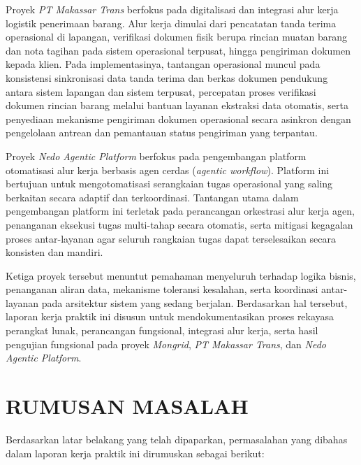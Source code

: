 Proyek \textit{PT Makassar Trans} berfokus pada digitalisasi dan integrasi alur kerja logistik penerimaan barang. Alur kerja dimulai dari pencatatan tanda terima operasional di lapangan, verifikasi dokumen fisik berupa rincian muatan barang dan nota tagihan pada sistem operasional terpusat, hingga pengiriman dokumen kepada klien. Pada implementasinya, tantangan operasional muncul pada konsistensi sinkronisasi data tanda terima dan berkas dokumen pendukung antara sistem lapangan dan sistem terpusat, percepatan proses verifikasi dokumen rincian barang melalui bantuan layanan ekstraksi data otomatis, serta penyediaan mekanisme pengiriman dokumen operasional secara asinkron dengan pengelolaan antrean dan pemantauan status pengiriman yang terpantau.

Proyek \textit{Nedo Agentic Platform} berfokus pada pengembangan platform otomatisasi alur kerja berbasis agen cerdas (\textit{agentic workflow}). Platform ini bertujuan untuk mengotomatisasi serangkaian tugas operasional yang saling berkaitan secara adaptif dan terkoordinasi. Tantangan utama dalam pengembangan platform ini terletak pada perancangan orkestrasi alur kerja agen, penanganan eksekusi tugas multi-tahap secara otomatis, serta mitigasi kegagalan proses antar-layanan agar seluruh rangkaian tugas dapat terselesaikan secara konsisten dan mandiri.

Ketiga proyek tersebut menuntut pemahaman menyeluruh terhadap logika bisnis, penanganan aliran data, mekanisme toleransi kesalahan, serta koordinasi antar-layanan pada arsitektur sistem yang sedang berjalan. Berdasarkan hal tersebut, laporan kerja praktik ini disusun untuk mendokumentasikan proses rekayasa perangkat lunak, perancangan fungsional, integrasi alur kerja, serta hasil pengujian fungsional pada proyek \textit{Mongrid}, \textit{PT Makassar Trans}, dan \textit{Nedo Agentic Platform}.

\section{RUMUSAN MASALAH}

Berdasarkan latar belakang yang telah dipaparkan, permasalahan yang dibahas dalam laporan kerja praktik ini dirumuskan sebagai berikut:

